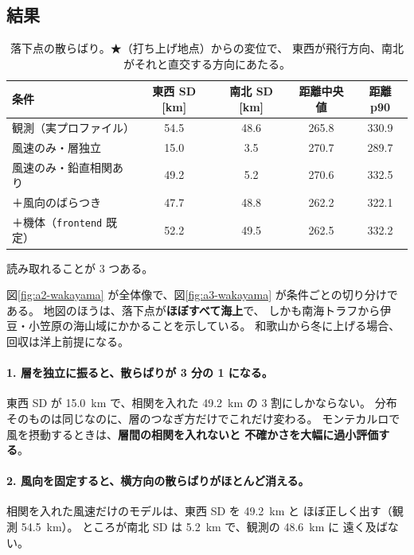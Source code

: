 \subsection{結果}




\begin{table}[H]
\centering
\caption{落下点の散らばり。★（打ち上げ地点）からの変位で、
東西が飛行方向、南北がそれと直交する方向にあたる。}
\label{tab:winter-spread}
\begin{tabular}{@{}lSSS[table-format=3.1]S[table-format=3.1]@{}}
\toprule
条件 & {東西 SD [\si{\kilo\metre}]} & {南北 SD [\si{\kilo\metre}]}
     & {距離中央値} & {距離 p90} \\
\midrule
観測（実プロファイル）        & 54.5 & 48.6 & 265.8 & 330.9 \\
\addlinespace
風速のみ・層独立            & 15.0 & 3.5  & 270.7 & 289.7 \\
風速のみ・鉛直相関あり        & 49.2 & 5.2  & 270.6 & 332.5 \\
＋風向のばらつき            & 47.7 & 48.8 & 262.2 & 322.1 \\
＋機体（\texttt{frontend} 既定） & 52.2 & 49.5 & 262.5 & 332.2 \\
\bottomrule
\end{tabular}
\end{table}

読み取れることが 3 つある。

図\ref{fig:a2-wakayama} が全体像で、図\ref{fig:a3-wakayama} が条件ごとの切り分けである。
地図のほうは、落下点が\textbf{ほぼすべて海上}で、
しかも南海トラフから伊豆・小笠原の海山域にかかることを示している。
和歌山から冬に上げる場合、回収は洋上前提になる。

\paragraph{1. 層を独立に振ると、散らばりが 3 分の 1 になる。}
東西 SD が \SI{15.0}{\kilo\metre} で、相関を入れた \SI{49.2}{\kilo\metre} の
3 割にしかならない。
分布そのものは同じなのに、層のつなぎ方だけでこれだけ変わる。
モンテカルロで風を摂動するときは、\textbf{層間の相関を入れないと
不確かさを大幅に過小評価する}。

\paragraph{2. 風向を固定すると、横方向の散らばりがほとんど消える。}
相関を入れた風速だけのモデルは、東西 SD を \SI{49.2}{\kilo\metre} と
ほぼ正しく出す（観測 \SI{54.5}{\kilo\metre}）。
ところが南北 SD は \SI{5.2}{\kilo\metre} で、観測の \SI{48.6}{\kilo\metre} に
遠く及ばない。

